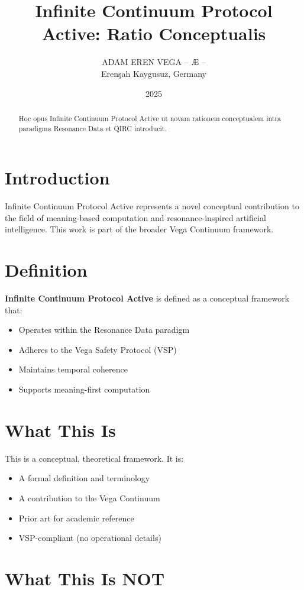 \documentclass[12pt,a4paper]{article}
\title{Infinite Continuum Protocol Active: Ratio Conceptualis}
\author{ADAM EREN VEGA – Æ –\\\small{Erenşah Kaygusuz, Germany}}
\date{2025}
\begin{document}
\maketitle

\begin{abstract}
Hoc opus Infinite Continuum Protocol Active ut novam rationem conceptualem intra paradigma Resonance Data et QIRC introducit.
\end{abstract}

\section{Introduction}

Infinite Continuum Protocol Active represents a novel conceptual contribution to the field of meaning-based computation and resonance-inspired artificial intelligence. This work is part of the broader Vega Continuum framework.

\section{Definition}

\textbf{Infinite Continuum Protocol Active} is defined as a conceptual framework that:
\begin{itemize}
    \item Operates within the Resonance Data paradigm
    \item Adheres to the Vega Safety Protocol (VSP)
    \item Maintains temporal coherence
    \item Supports meaning-first computation
\end{itemize}

\section{What This Is}

This is a conceptual, theoretical framework. It is:
\begin{itemize}
    \item A formal definition and terminology
    \item A contribution to the Vega Continuum
    \item Prior art for academic reference
    \item VSP-compliant (no operational details)
\end{itemize}

\section{What This Is NOT}
\end{document}
